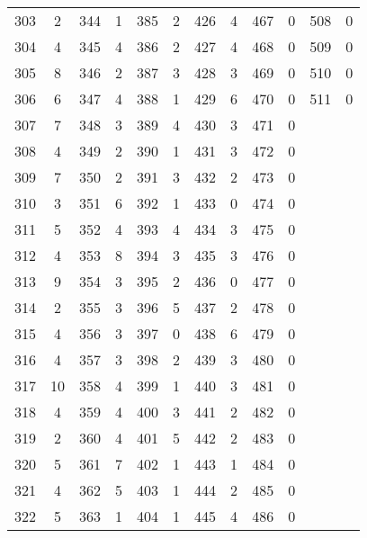 \begin{table}[H]
\begin{tabular}{S S | S S | S S | S S | S S | S S}
        303 &  2  &  344  &  1  &  385 &    2  &  426 &    4  &  467 &    0  &  508 &    0  \\
        304 &  4  &  345  &  4  &  386 &    2  &  427 &    4  &  468 &    0  &  509 &    0  \\
        305 &  8  &  346  &  2  &  387 &    3  &  428 &    3  &  469 &    0  &  510 &    0  \\
        306 &  6  &  347  &  4  &  388 &    1  &  429 &    6  &  470 &    0  &  511 &    0  \\
        307 &  7  &  348  &  3  &  389 &    4  &  430 &    3  &  471 &    0  &      &       \\
        308 &  4  &  349  &  2  &  390 &    1  &  431 &    3  &  472 &    0  &      &       \\
        309 &  7  &  350  &  2  &  391 &    3  &  432 &    2  &  473 &    0  &      &       \\
        310 &  3  &  351  &  6  &  392 &    1  &  433 &    0  &  474 &    0  &      &       \\
        311 &  5  &  352  &  4  &  393 &    4  &  434 &    3  &  475 &    0  &      &       \\
        312 &  4  &  353  &  8  &  394 &    3  &  435 &    3  &  476 &    0  &      &       \\
        313 &  9  &  354  &  3  &  395 &    2  &  436 &    0  &  477 &    0  &      &       \\
        314 &  2  &  355  &  3  &  396 &    5  &  437 &    2  &  478 &    0  &      &       \\
        315 &  4  &  356  &  3  &  397 &    0  &  438 &    6  &  479 &    0  &      &       \\
        316 &  4  &  357  &  3  &  398 &    2  &  439 &    3  &  480 &    0  &      &       \\
        317 & 10  &  358  &  4  &  399 &    1  &  440 &    3  &  481 &    0  &      &       \\
        318 &  4  &  359  &  4  &  400 &    3  &  441 &    2  &  482 &    0  &      &       \\
        319 &  2  &  360  &  4  &  401 &    5  &  442 &    2  &  483 &    0  &      &       \\
        320 &  5  &  361  &  7  &  402 &    1  &  443 &    1  &  484 &    0  &      &       \\
        321 &  4  &  362  &  5  &  403 &    1  &  444 &    2  &  485 &    0  &      &       \\
        322 &  5  &  363  &  1  &  404 &    1  &  445 &    4  &  486 &    0  &      &       \\

\end{tabular}
\end{table}
